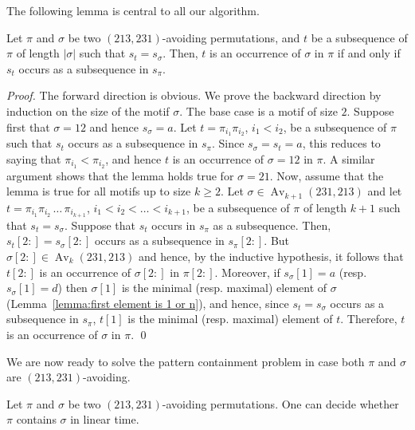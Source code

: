 \documentclass[a4paper]{llncs}
\DeclareMathOperator{\Avd}{Av}
\newcommand\Av[2]{\Avd_{{#1}}({#2})}
\begin{document}
The following lemma is central to all our algorithm.

\begin{lemma}
\label{lemma:MatchStripeToPermutation}
Let $\pi$ and $\sigma$ be two $(213,231)$-avoiding permutations,
and $t$ be a subsequence of $\pi$ of length $|\sigma|$ such that $s_t = s_\sigma$.
Then, $t$ is an occurrence of $\sigma$ in $\pi$ if and only if
$s_t$ occurs as a subsequence in $s_\pi$.
\end{lemma}

\begin{proof}
  The forward direction is obvious.
  We prove the backward direction by induction on the size of the motif
  $\sigma$.
  The base case is a motif of size $2$.
  Suppose first that $\sigma = 12$ and hence $s_\sigma = a$.
  Let $t = \pi_{i_1}\pi_{i_2}$, $i_1 < i_2$, be a subsequence of $\pi$
  such that $s_t$ occurs as a subsequence in $s_\pi$.
  Since $s_\sigma = s_t = a$, this reduces to saying that
  $\pi_{i_1} < \pi_{i_2}$, and hence $t$ is an occurrence of $\sigma = 12$ in $\pi$.
  A similar argument shows that the lemma holds true for $\sigma = 21$.
  Now, assume that the lemma is true for all motifs up to size $k \geq 2$.
  Let $\sigma \in \Av{k+1}{231,213}$ and
  let $t = \pi_{i_1}\pi_{i_2}\,\ldots\,\pi_{i_{k+1}}$,
  $i_1 < i_2 < \ldots < i_{k+1}$,
  be a subsequence of $\pi$ of length $k+1$ such that
  $s_t = s_\sigma$.
  Suppose that $s_t$ occurs in $s_\pi$ as a subsequence.
  Then, $s_t[2:] = s_\sigma[2:]$ occurs as a subsequence in $s_\pi[2:]$.
  But $\sigma[2:] \in \Av{k}{231,213}$ and hence,
  by the inductive hypothesis, it follows that
  $t[2:]$ is an occurrence of $\sigma[2:]$ in $\pi[2:]$.
  Moreover, if $s_\sigma[1] = a$ (resp. $s_\sigma[1] = d$)
  then $\sigma[1]$ is the minimal (resp. maximal) element of $\sigma$
  (Lemma~\ref{lemma:first element is 1 or n}),
  and hence, since $s_t = s_\sigma$ occurs as a subsequence in $s_\pi$,
  $t[1]$ is the minimal (resp. maximal) element of $t$.
  Therefore, $t$ is an occurrence of $\sigma$ in $\pi$.
  \qed
\end{proof}

We are now ready to solve the pattern containment problem in case
both $\pi$ and $\sigma$ are $(213, 231)$-avoiding.

\begin{proposition}
	\label{Proposition:both permutations are avoiding}
	Let $\pi$ and $\sigma$ be two $(213,231)$-avoiding permutations.
	One can decide whether $\pi$ contains $\sigma$ in linear time.
\end{proposition}
\end{document}
